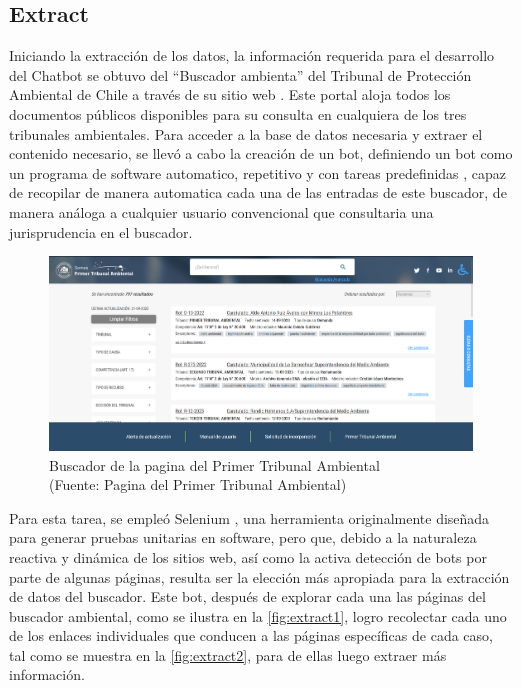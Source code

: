 \subsection{Extract}

Iniciando la extracción de los datos, la información requerida para el desarrollo del Chatbot se obtuvo del ``Buscador ambienta'' del Tribunal de Protección Ambiental 
de Chile a través de su sitio web \cite{BuscadorAmbiental}. Este portal aloja todos los documentos públicos disponibles para su consulta en cualquiera 
de los tres tribunales ambientales. Para acceder a la base de datos necesaria y extraer el contenido necesario, se llevó a cabo la creación de 
un bot, definiendo un bot como un programa de software automatico, repetitivo y con tareas predefinidas \cite{Kaspersky_2023}, capaz de recopilar
de manera automatica cada una de las entradas de este buscador, de manera análoga a cualquier usuario convencional
que consultaria una jurisprudencia en el buscador.

\begin{figure}[ht!]
    \centering
    \includegraphics[width=.75\textwidth]{figures/huemul2.png}
    \caption[Screenshot del Buscador de la pagina del Primer Tribunal Ambiental]{Buscador de la pagina del Primer Tribunal Ambiental\\
    {\scriptsize (Fuente: Pagina del Primer Tribunal Ambiental)}}
    \label{fig:extract1}
\end{figure}
    
Para esta tarea, se empleó Selenium \cite{seleniumSelenium}, una herramienta originalmente diseñada para generar pruebas unitarias en software, pero que, debido a la naturaleza 
reactiva y dinámica de los sitios web, así como la activa detección de bots por parte de algunas páginas, resulta ser la elección 
más apropiada para la extracción de datos del buscador. Este bot, después de explorar cada una las páginas del buscador ambiental, como se ilustra en la \autoref{fig:extract1},
logro recolectar cada uno de los enlaces individuales que conducen a las páginas específicas de cada caso, tal como se 
muestra en la \autoref{fig:extract2}, para de ellas luego extraer más información.

